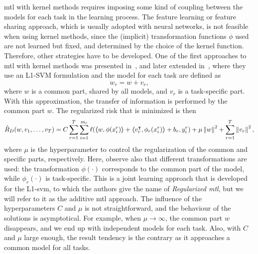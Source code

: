 \acrshort{mtl} with kernel methods requires imposing some kind of coupling between the models for each task in the learning process. The feature learning or feature sharing approach, which is usually adopted with neural networks, is not feasible when using kernel methods, since the (implicit) transformation functions $\phi$ used are not learned but fixed, and determined by the choice of the kernel function. Therefore, other strategies have to be developed. 
One of the first approaches to \acrshort{mtl} with kernel methods was presented in~\cite{EvgeniouP04}, and later extended in~\citet{CaiC09, CaiC12}, where they use an L1-SVM formulation and the model for each task are defined as
\begin{equation}
    \nonumber
    {w}_r = {w} + {v}_r,
\end{equation} 
where $w$ is a common part, shared by all models, and $v_r$ is a task-specific part. With this approximation, the transfer of information is performed by the common part ${w}$.
The regularized risk that is minimized is then
\begin{equation}
    \nonumber
    \hat{R}_{D} ({w, v_1, \ldots, v_T}) = C \sum_{r=1}^{T} \sum_{i=1}^{m_r} \ell(
        \bm{\left\langle} w, \phi({x}_i^r) \bm{\right\rangle} + \bm{\left\langle} {v}_r^\intercal, \phi_r({x}_i^r) \bm{\right\rangle} + b_r, y_i^r) + \mu \left\lVert{w}\right\rVert^2 + \sum_{r=1}^T \left\lVert{v}_r\right\rVert^2,
\end{equation}
where $\mu$ is the hyperparameter to control the regularization of the common and specific parts, respectively. 
Here, observe also that different transformations are used: the transformation $\phi(\cdot)$ corresponds to the common part of the model, while $\phi_r(\cdot)$ is task-specific.
%
This is a joint learning approach that is developed for the L1-\acrshort{svm}, to which the authors give the name of \emph{Regularized \acrshort{mtl}}, but we will refer to it as the {additive} \acrshort{mtl} approach.
The influence of the hyperparameters $C$ and $\mu$ is not straightforward, and the behaviour of the solutions is asymptotical. For example, when $\mu \to \infty$, the common part $w$ disappears, and we end up with independent models for each task. Also, with $C$ and $\mu$ large enough, the result tendency is the contrary as it approaches a common model for all tasks.

